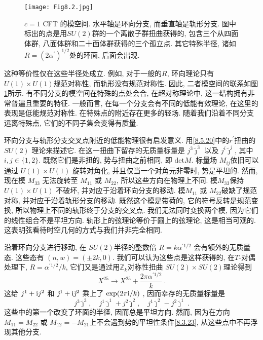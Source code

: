  

\begin{figure}[h]
	\begin{center}
		\texttt{[image: Fig8.2.jpg]}
		\caption{$c=1$ CFT 的模空间. 水平轴是环向分支, 而垂直轴是轨形分支. 图中标出的点是用$SU(2)$群的一个离散子群扭曲获得的, 
		包含三个从四面体群, 八面体群和二十面体群获得的三个孤立点. 其它特殊半径, 诸如$R=(2 \alpha^{\prime})^{1/2}$处的环面, 后面会出现.}\label{Fig8.2}
	\end{center}
\end{figure}

这种等价性仅在这些半径处成立. 例如, 对于一般的$R$, 环向理论只有 $U(1) \times U(1)$规范对称性, 而轨形没有规范对称性. 
因此, 二者模空间的联系如图\ref{Fig8.2}所示. 有不同分支的模空间在特殊的点处会合, 在超对称理论中, 这一结构拥有非常普遍且重要的特征. 
一般而言, 在每一个分支会有不同的低能有效理论, 在这里的表现是低能规范对称性. 在特殊点的附近存在更多的轻场. 
随着我们沿着不同分支远离特殊点, 它们的不同子集会变得有质量.

环向分支与轨形分支交叉点附近的低能物理很有启发意义. 用\eqref{8.5.20}中的$r^{\prime}$扭曲的 $S U(2)$ 理论来描述它. 
在这一扭曲下留存的无质量标量是 $j^{3} \tilde{\jmath}^{3}$ 以及 $j^{i} \tilde{\jmath}^{j}$, 其中$i, j \in\{1,2\}$. 
既然它们是非扭的, 势与扭曲之前相同, 即 $\mathrm{det} M$. 标量场 $M_{i j}$依旧可以通过 $U(1) \times U(1)$ 旋转对角化, 
并且仅当一个对角元非零时, 势是平坦的. 然而, 现在模 $M_{33}$ 无法旋转至 $M_{11}$ 或 $M_{22}$, 所以这些方向在物理上不同. 
模$M_{33}$保持 $U(1) \times U(1)$ 不破坏, 并对应于沿着环向分支的移动. 模$M_{11}$ 或 $M_{22}$破缺了规范对称, 并对应于沿着轨形分支的移动. 
既然这个模是带荷的, 它的符号反转是规范变换, 所以物理上不同的轨形终于分支的交叉点. 我们无法同时变换两个模, 因为它们的线性组合不是平坦方向. 
轨形上的弦理论等价于圆上的弦理论, 这是相当可观的. 这表明弦看待时空几何的方式与我们并非完全相同.

沿着环向分支进行移动, 在 $SU(2)$半径的整数倍 $R=k \alpha^{\prime 1/2} $ 会有额外的无质量态. 这些态有 $(n, w)=(\pm 2 k, 0)$. 
我们可以认为这些点是这样获得的, 在$T$-对偶处理下,  $R=\alpha^{\prime 1/2} / k$,
 它们又是通过用$\mathds{Z}_{k}$对称性扭曲 $S U(2) \times S U(2)$理论得到
\begin{equation}
	X^{25} \rightarrow X^{25}+\frac{2 \pi \alpha^{\prime 1/2}}{k} \:. \label{8.5.22}
\end{equation}
这给 $j^{1}+\mathrm{i} j^{2}$ 和 $\tilde{\jmath}^{1}+\mathrm{i} \tilde{\jmath}^{2}$ 乘上了 $\exp (2 \pi \mathrm{i} / k)$ , 因而幸存的无质量标量是
\begin{equation}
	j^{3} \tilde{\jmath}^{3}, \quad j^{1} \tilde{\jmath}^{1}+j^{2} \tilde{\jmath}^{2}, \quad 
	j^{1} \tilde{\jmath}^{2}-j^{2} \tilde{\jmath}^{1} \:. \label{8.5.23}
\end{equation}
这些中的第一个改变了环面的半径, 因而总是平坦方向. 然而, 因为在方向$M_{11}=M_{22}$ 或 $M_{12}=-M_{21}$上不会遇到势的平坦性条件\eqref{8.3.23}, 
从这些点中不再浮现其他分支.

